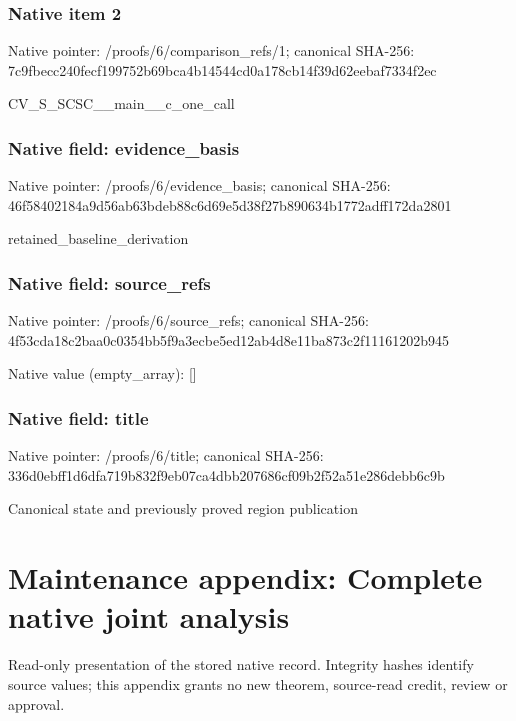 \documentclass[10pt,a4paper]{article}
\begin{document}
\subsubsection{Native item 2}


Native pointer: /proofs/6/comparison\_refs/1; canonical SHA-256: 7c9fbecc240fecf199752b69\allowbreak{}bca4b14544cd0a178cb14f39\allowbreak{}d62eebaf7334f2ec


CV\_S\_SCSC\_\_main\_\_c\_one\_call


\subsubsection{Native field: evidence\_basis}


Native pointer: /proofs/6/evidence\_basis; canonical SHA-256: 46f58402184a9d56ab63bdeb\allowbreak{}88c6d69e5d38f27b890634b1\allowbreak{}772adff172da2801


retained\_baseline\_derivation


\subsubsection{Native field: source\_refs}


Native pointer: /proofs/6/source\_refs; canonical SHA-256: 4f53cda18c2baa0c0354bb5f\allowbreak{}9a3ecbe5ed12ab4d8e11ba87\allowbreak{}3c2f11161202b945



Native value (empty\_array): []



\subsubsection{Native field: title}


Native pointer: /proofs/6/title; canonical SHA-256: 336d0ebff1d6dfa719b832f9\allowbreak{}eb07ca4dbb207686cf09b2f5\allowbreak{}2a51e286debb6c9b


Canonical state and previously proved region publication


\section{Maintenance appendix: Complete native joint analysis}


Read-only presentation of the stored native record. Integrity hashes identify source values; this appendix grants no new theorem, source-read credit, review or approval.
\end{document}

